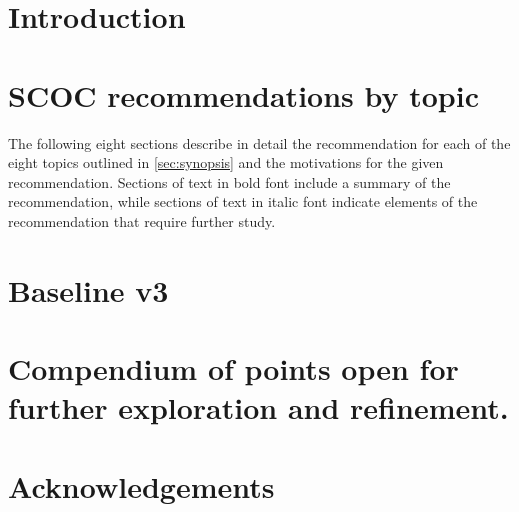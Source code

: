 \section{Introduction}




%
\clearpage

\section{SCOC recommendations by topic}\label{sec:rec}
The following eight sections describe in detail the recommendation for each of the eight topics outlined in \autoref{sec:synopsis} and the motivations for the given recommendation. Sections of text in bold font include a summary of the recommendation, while sections of text in italic font indicate elements of the recommendation that require further study. 


\clearpage

\section{Baseline v3}\label{sec:v3}

\clearpage

\section{Compendium of points open for further exploration and refinement.}
\label{sec:refinements}
\clearpage


\appendix
\section{Acknowledgements}


